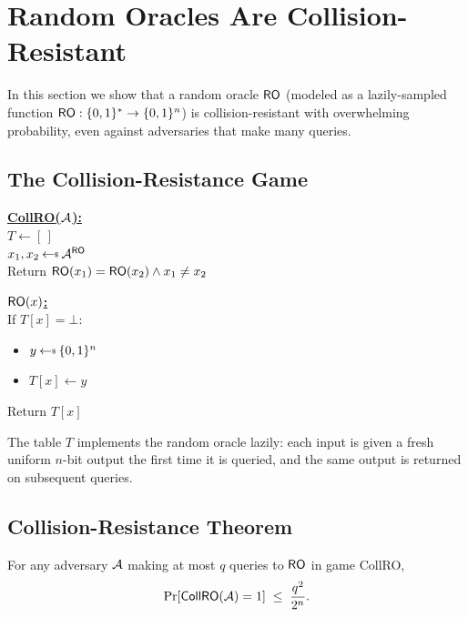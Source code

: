 \documentclass[11pt]{article}
\begin{document}
\section{Random Oracles Are Collision-Resistant}

In this section we show that a random oracle $\mathsf{RO}$ (modeled as a lazily-sampled
function $\mathsf{RO} : \{0,1\}^* \to \{0,1\}^n$) is collision-resistant with
overwhelming probability, even against adversaries that make many queries.

\subsection{The Collision-Resistance Game}

\begin{tcolorbox}[title={Game \textsf{CollRO}($\advA$)}, colback=blue!5, colframe=blue!40!black]
\textbf{\underline{\textsf{CollRO}($\advA$):}}\\
$T \leftarrow [\,]$\\
$x_1, x_2 \getsr \advA^{\RO}$\\
Return $\mathsf{RO}(x_1) = \mathsf{RO}(x_2) \wedge x_1 \neq x_2$

\bigskip
\textbf{\underline{$\mathsf{RO}(x)$:}}\\
If $T[x] = \bot$:
\begin{itemize}[leftmargin=2em, topsep=2pt, itemsep=0pt]
  \item $y \getsr \{0,1\}^n$
  \item $T[x] \leftarrow y$
\end{itemize}
Return $T[x]$
\end{tcolorbox}

The table $T$ implements the random oracle lazily: each input is given a fresh
uniform $n$-bit output the first time it is queried, and the same output is
returned on subsequent queries.

\subsection{Collision-Resistance Theorem}

\begin{theorem}
\label{thm:collro}
For any adversary $\advA$ making at most $q$ queries to $\mathsf{RO}$ in game
\textsf{CollRO},
\[
  \Pr[\textsf{CollRO}(\mathcal{A}) = 1] \;\le\; \frac{q^2}{2^n}.
\]
\end{theorem}
\end{document}
